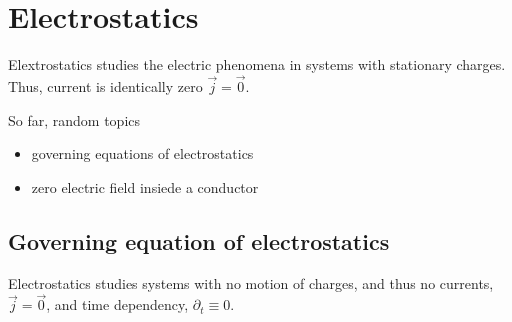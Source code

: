 \documentclass[letterpaper,10pt,english]{jupyterBook}
\begin{document}
\sphinxstepscope


\section{Electrostatics}
\label{\detokenize{ch/regimes-electrostatics:electrostatics}}\label{\detokenize{ch/regimes-electrostatics:classical-electromagnetism-electrostatics}}\label{\detokenize{ch/regimes-electrostatics::doc}}
\sphinxAtStartPar
Elextrostatics studies the electric phenomena in systems with stationary charges. Thus, current is identically zero \(\vec{j} = \vec{0}\).

\sphinxAtStartPar
So far, random topics
\begin{itemize}
\item {} 
\sphinxAtStartPar
governing equations of electrostatics

\item {} 
\sphinxAtStartPar
zero electric field insiede a conductor

\end{itemize}


\subsection{Governing equation of electrostatics}
\label{\detokenize{ch/regimes-electrostatics:governing-equation-of-electrostatics}}
\sphinxAtStartPar
Electrostatics studies systems with no motion of charges, and thus no currents, \(\vec{j} = \vec{0}\), and time dependency, \(\partial_t \equiv 0\).
\end{document}
